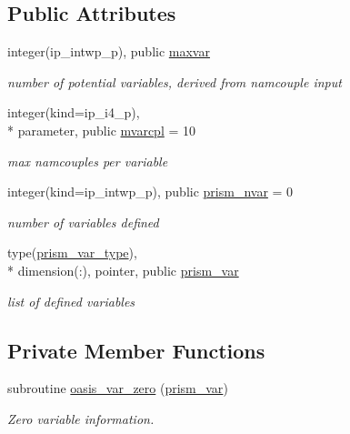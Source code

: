 \subsection*{Public Attributes}
\begin{DoxyCompactItemize}
\item 
integer(ip\+\_\+intwp\+\_\+p), public \hyperlink{classmod__oasis__var_a151c4be67882fc8d02f66e4a1822b692}{maxvar}
\begin{DoxyCompactList}\small\item\em number of potential variables, derived from namcouple input \end{DoxyCompactList}\item 
integer(kind=ip\+\_\+i4\+\_\+p), \\*
parameter, public \hyperlink{classmod__oasis__var_a687d6dce16699f36ae3a67accfdba3a9}{mvarcpl} = 10
\begin{DoxyCompactList}\small\item\em max namcouples per variable \end{DoxyCompactList}\item 
integer(kind=ip\+\_\+intwp\+\_\+p), public \hyperlink{classmod__oasis__var_a095f8ad84e6afbcbe1744d4a9f924e08}{prism\+\_\+nvar} = 0
\begin{DoxyCompactList}\small\item\em number of variables defined \end{DoxyCompactList}\item 
type(\hyperlink{structmod__oasis__var_1_1prism__var__type}{prism\+\_\+var\+\_\+type}), \\*
dimension(\+:), pointer, public \hyperlink{classmod__oasis__var_ae66c490437c2960d795fbd3d2c773a0a}{prism\+\_\+var}
\begin{DoxyCompactList}\small\item\em list of defined variables \end{DoxyCompactList}\end{DoxyCompactItemize}
\subsection*{Private Member Functions}
\begin{DoxyCompactItemize}
\item 
subroutine \hyperlink{classmod__oasis__var_aa780f62e9eded0a55d0077a990bf2443}{oasis\+\_\+var\+\_\+zero} (\hyperlink{classmod__oasis__var_ae66c490437c2960d795fbd3d2c773a0a}{prism\+\_\+var})
\begin{DoxyCompactList}\small\item\em Zero variable information. \end{DoxyCompactList}\end{DoxyCompactItemize}


